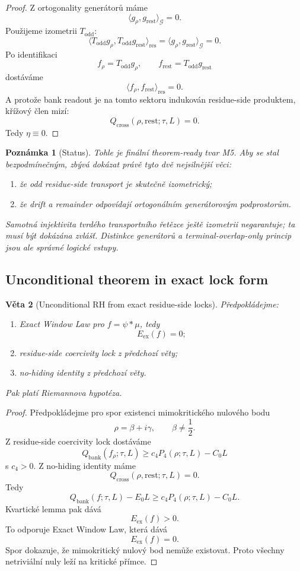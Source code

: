 \documentclass[11pt,a4paper]{article}
\newtheorem{theorem}{Věta}[section]
\newtheorem{remark}[theorem]{Poznámka}
\begin{document}
\begin{proof}
Z ortogonality generátorů máme
\[
\langle g_\rho,g_{\mathrm{rest}}\rangle_{\mathcal G}=0.
\]
Použijeme izometrii \(T_{\mathrm{odd}}\):
\[
\langle T_{\mathrm{odd}}g_\rho,T_{\mathrm{odd}}g_{\mathrm{rest}}\rangle_{\mathrm{res}}
=
\langle g_\rho,g_{\mathrm{rest}}\rangle_{\mathcal G}=0.
\]
Po identifikaci
\[
f_\rho=T_{\mathrm{odd}}g_\rho,
\qquad
f_{\mathrm{rest}}=T_{\mathrm{odd}}g_{\mathrm{rest}}
\]
dostáváme
\[
\langle f_\rho,f_{\mathrm{rest}}\rangle_{\mathrm{res}}=0.
\]
A protože bank readout je na tomto sektoru indukován residue-side produktem, křížový člen mizí:
\[
Q_{\mathrm{cross}}(\rho,\mathrm{rest};\tau,L)=0.
\]
Tedy \(\eta\equiv 0\).
\end{proof}

\begin{remark}[Status]
Tohle je finální theorem-ready tvar M5.
Aby se stal bezpodmínečným, zbývá dokázat právě tyto dvě nejsilnější věci:
\begin{enumerate}[label=\textbf{(\arabic*)}]
    \item že odd residue-side transport je skutečně izometrický;
    \item že drift a remainder odpovídají ortogonálním generátorovým podprostorům.
\end{enumerate}
Samotná injektivita tvrdého transportního řetězce ještě izometrii negarantuje; ta musí být
dokázána zvlášť. Distinkce generátorů a terminal-overlap-only princip jsou ale správné logické
vstupy.
\end{remark}

\subsection*{Unconditional theorem in exact lock form}

\begin{theorem}[Unconditional RH from exact residue-side locks]
Předpokládejme:
\begin{enumerate}[label=\textbf{(\arabic*)}]
    \item Exact Window Law pro \(f=\psi*\mu\), tedy
    \[
    E_{\mathrm{ex}}(f)=0;
    \]
    \item residue-side coercivity lock z předchozí věty;
    \item no-hiding identity z předchozí věty.
\end{enumerate}
Pak platí Riemannova hypotéza.
\end{theorem}

\begin{proof}
Předpokládejme pro spor existenci mimokritického nulového bodu
\[
\rho=\beta+i\gamma,\qquad \beta\neq \frac12.
\]
Z residue-side coercivity lock dostáváme
\[
Q_{\mathrm{bank}}(f_\rho;\tau,L)\ge c_4P_4(\rho;\tau,L)-C_0L
\]
s \(c_4>0\). Z no-hiding identity máme
\[
Q_{\mathrm{cross}}(\rho,\mathrm{rest};\tau,L)=0.
\]
Tedy
\[
Q_{\mathrm{bank}}(f;\tau,L)-E_0L
\ge
c_4P_4(\rho;\tau,L)-C_0L.
\]
Kvartické lemma pak dává
\[
E_{\mathrm{ex}}(f)>0.
\]
To odporuje Exact Window Law, která dává
\[
E_{\mathrm{ex}}(f)=0.
\]
Spor dokazuje, že mimokritický nulový bod nemůže existovat. Proto všechny netriviální nuly
leží na kritické přímce.
\end{proof}
\end{document}
